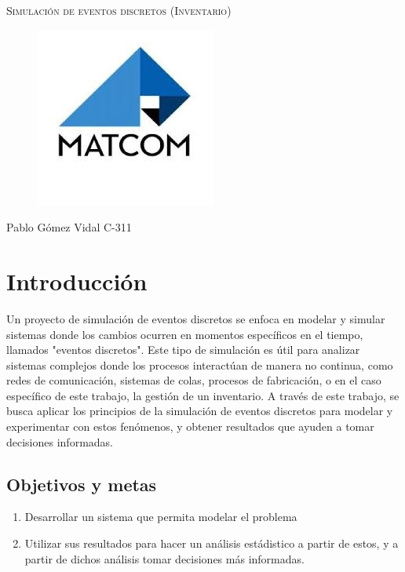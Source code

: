 \documentclass{article}
\begin{document}
\begin{titlepage}
    \centering
   
    {\scshape\Huge Simulación de eventos discretos (Inventario) \par}
    \begin{figure}[H]
    \centering
    \includegraphics[width=0.3\linewidth]{./matcom.png}
    \label{fig:enter-label}
\end{figure}

    {\Large Pablo Gómez Vidal C-311 \par}
    
\end{titlepage}

\section*{Introducción}
Un proyecto de simulación de eventos discretos se enfoca en modelar y simular sistemas donde los cambios ocurren en momentos específicos en el tiempo, llamados "eventos discretos". Este tipo de simulación es útil para analizar sistemas complejos donde los procesos interactúan de manera no continua, como redes de comunicación, sistemas de colas, procesos de fabricación, o en el caso específico de este trabajo, la gestión de un inventario.
A través de este trabajo, se busca aplicar los principios de la simulación de eventos discretos para modelar
y experimentar con estos fenómenos, y obtener resultados que ayuden a tomar decisiones informadas.


\subsection*{Objetivos y metas}
\begin{enumerate}
    \item Desarrollar un sistema que permita modelar el problema
    \item Utilizar sus resultados para hacer un análisis estádistico a partir de estos, y a partir de dichos análisis tomar decisiones más informadas.
\end{enumerate}
\end{document}
